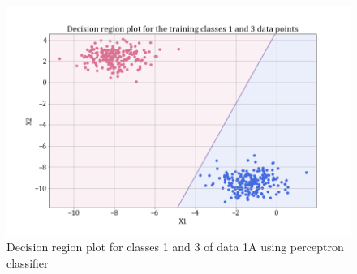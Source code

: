 \documentclass[11pt,a4paper]{article}
\begin{document}
\begin{figure}[H]
    \centering
    \includegraphics[scale = 0.35]{images/training classes 1 and 3dec_reg_perceptron.png}
    \caption{Decision region plot for classes 1 and 3 of data 1A using perceptron classifier}
    \label{fig:perc_dec_reg_13}
\end{figure}



\end{document}
